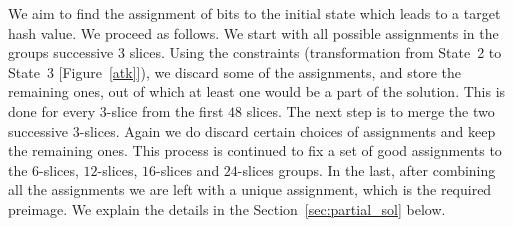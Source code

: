 We aim to find the assignment of bits to the initial state which leads to a target hash value. We proceed as follows. We start with all possible assignments in the groups successive $3$ slices. Using the constraints (transformation from State~2 to State~3 [Figure~\ref{atk}]), we discard some of the assignments, and store the remaining ones, out of which at least one would be a part of the solution. This is done for every $3$-slice from the first $48$ slices. The next step is to merge the two successive $3$-slices. Again we do discard certain choices of assignments and keep the remaining ones. This process is continued to fix a set of good assignments to the $6$-slices, $12$-slices, $16$-slices and $24$-slices groups. In the last, after combining all the assignments we are left with a unique assignment, which is the required preimage. We explain the details in the Section~\ref{sec:partial_sol} below. 

